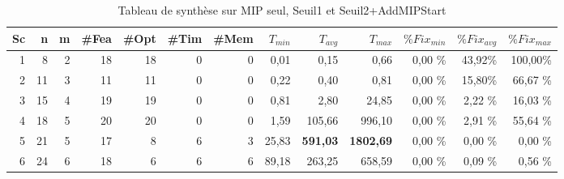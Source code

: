 \documentclass[twoside,fleqn]{EPURapport}
\begin{document}
\begin{table}[h]
\begin{tabular}{|r|r|r|r|r|r|r|r|r|r|r|r|r|}
    	Sc &	n	&m	&\#Fea	&\#Opt	&\#Tim &\#Mem	&$T_{min}$ & $T_{avg}$	& $T_{max}$ & $\%Fix_{min}$ & $\%Fix_{avg}$	& $\%Fix_{max}$ \\ \hline
1&	8	&2	&18	&18	&0	&0	&0,01	&0,15	    &0,66	 	&0,00	\%&43,92\%&	100,00\%    \\ \hline
2&	11	&3	&11	&11	&0	&0	&0,22	&0,40	    &0,81		&0,00	\%&15,80\%&	66,67 \%     \\ \hline
3&	15	&4	&19	&19	&0	&0	&0,81	&2,80	    &24,85	&0,00	\%&2,22	\%&16,03 \%  \\ \hline
4&	18	&5	&20	&20	&0	&0	&1,59	&105,66	&996,10	&0,00	\%&2,91	\%&55,64 \%    \\ \hline
5&	21	&5	&17	&8	&6	&3	&25,83	&\textbf{591,03}	&\textbf{1802,69}	&0,00	\%&0,00	\%&0,00  \%     \\ \hline
6&	24	&6	&18	&6	&6	&6	&89,18	&263,25	&658,59	&0,00	\%&0,09	\%&0,56  \%  \\ \hline
    \end{tabular}

    \caption{Tableau de synthèse sur MIP seul, Seuil1 et Seuil2+AddMIPStart}
    \label{tab_mip_s1_ams2}
\end{table}
\bigskip


\end{document}

